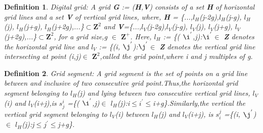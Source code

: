 \documentclass[12pt]{article}
\newtheorem{DEF}{Definition}
\begin{document}
\begin{DEF}
\textnormal{Digital grid}: A grid \textbf{G} := (\textbf{H},\textbf{V}) consists of a set \textbf{H} of horizontal grid lines and a set \textbf{V} of vertical grid lines, where, \textbf{H} = \{...,${\textit{l}}_H$(\textit{j-2g}),${\textit{l}}_H$(\textit{j-g}), ${\textit{l}}_H$(\textit{j}), ${\textit{l}}_H$(\textit{j+g}), ${\textit{l}}_H$(\textit{j+2g}),...\}{$\subset $$\textbf{Z}^2$} and \textbf{V}=\{...,${\textit{l}}_V$(\textit{j-2g}),${\textit{l}}_V$(\textit{j-g}), ${\textit{l}}_V$(\textit{j}), ${\textit{l}}_V$(\textit{j+g}), ${\textit{l}}_V$(\textit{j+2g}),...\}{$\subset $$\textbf{Z}^2$}, for a grid size,\textit{g} $\in$ {$\textbf{Z}^+$}. Here, ${\textit{l}}_H$ := \{(\textit{ $\i^{'}$},\textit{j}):\textit{$\i^{'}$}$\in$ \textbf{Z} denotes the horizontal grid line and ${\textit{l}}_V$ := \{(\textit{i},\textit{ $\j^{'}$}):\textit{$\j^{'}$}$\in$ \textbf{Z} denotes the vertical grid line intersecting at point (\textit{i},\textit{j})$\in$ $\textbf{Z}^2$,called the grid point,where i and j multiples of g.
\end{DEF}

\begin{DEF}
\textnormal{Grid segment}: A grid segment is the set of points on a grid line between and inclusive of two consecutive grid point.Thus,the horizontal grid segment belonging to ${\textit{l}}_H$(\textit{j}) and lying between two consecutive vertical grid lines, ${\textit{l}}_V$(\textit{i}) and ${\textit{l}}_V$(\textit{i}+\textit{j}),is  \textit{$s_j^{i}$} =\{(\textit{ $\i^{'}$},\textit{j})$\in$ ${\textit{l}}_H$(\textit{j}):\textit{i}$\leq$\textit{$i^{'}$}$\leq$\textit{i}+\textit{g}\}.Similarly,the vertical the vertical grid segment belonging to ${\textit{l}}_V$(\textit{i}) between ${\textit{l}}_H$(\textit{j}) and ${\textit{l}}_V$(\textit{i}+\textit{j}), is \textit{$s_i^{j}$} =\{(\textit{i},\textit{ $\j^{'}$})$\in$ ${\textit{l}}_H$(\textit{j}):\textit{j}$\leq$\textit{$j^{'}$}$\leq$\textit{j}+\textit{g}\}.
\end{DEF}
\end{document}
